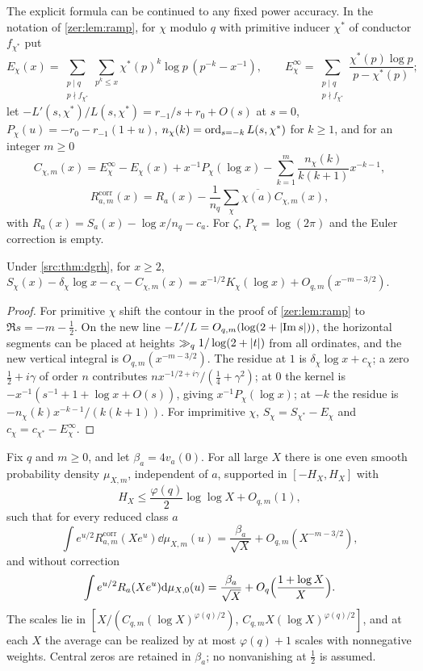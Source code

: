 The explicit formula can be continued to any fixed power accuracy. In the notation of \cref{zer:lem:ramp}, for
$\chi$ modulo $q$ with primitive inducer $\chi^*$ of conductor $f_{\chi^*}$ put
\[
 E_\chi(x)=\sum_{\substack{p\mid q\\p\nmid f_{\chi^*}}}\sum_{p^k\le x}\chi^*(p)^k\log p\,(p^{-k}-x^{-1}),\qquad
 E_\chi^\infty=\sum_{\substack{p\mid q\\p\nmid f_{\chi^*}}}\frac{\chi^*(p)\log p}{p-\chi^*(p)} ;
\]
let $-L'(s,\chi^*)/L(s,\chi^*)=r_{-1}/s+r_0+O(s)$ at $s=0$, $P_\chi(u)=-r_0-r_{-1}(1+u)$, $n_\chi(k)=\operatorname{ord}_{s=-k}L(s,\chi^*)$
for $k\ge1$, and for an integer $m\ge0$
\[
 C_{\chi,m}(x)=E_\chi^\infty-E_\chi(x)+x^{-1}P_\chi(\log x)-\sum_{k=1}^m\frac{n_\chi(k)}{k(k+1)}x^{-k-1},
\]
\[
 R^{\mathrm{corr}}_{a,m}(x)=R_a(x)-\frac1{n_q}\sum_\chi\overline{\chi(a)}C_{\chi,m}(x),
\]
with $R_a(x)=S_a(x)-\log x/n_q-c_a$. For $\zeta$, $P_\chi=\log(2\pi)$ and the Euler correction is empty.

\begin{lemma}\label{fil:lem:rampcorr}
Under \cref{src:thm:dgrh}, for $x\ge2$,
$S_\chi(x)-\delta_\chi\log x-c_\chi-C_{\chi,m}(x)=x^{-1/2}K_\chi(\log x)+O_{q,m}(x^{-m-3/2})$.
\end{lemma}

\begin{proof}
For primitive $\chi$ shift the contour in the proof of \cref{zer:lem:ramp} to $\Re s=-m-\tfrac12$. On the new line
$-L'/L=O_{q,m}(\log(2+\lvert\operatorname{Im} s\rvert))$, the horizontal segments can be placed at heights $\gg_q1/\log(2+\lvert t\rvert)$ from all
ordinates, and the new vertical integral is $O_{q,m}(x^{-m-3/2})$. The residue at $1$ is $\delta_\chi\log x+c_\chi$; a
zero $\tfrac12+i\gamma$ of order $n$ contributes $nx^{-1/2+i\gamma}/(\tfrac14+\gamma^2)$; at $0$ the kernel is
$-x^{-1}(s^{-1}+1+\log x+O(s))$, giving $x^{-1}P_\chi(\log x)$; at $-k$ the residue is
$-n_\chi(k)x^{-k-1}/(k(k+1))$. For imprimitive $\chi$, $S_\chi=S_{\chi^*}-E_\chi$ and $c_\chi=c_{\chi^*}-E_\chi^\infty$.
\end{proof}

\begin{theorem}\label{rec:thm:polylogavg}
Fix $q$ and $m\ge0$, and let $\beta_a=4v_a(0)$. For all large $X$ there is one even smooth probability density
$\mu_{X,m}$, independent of $a$, supported in $[-H_X,H_X]$ with
\[
 H_X\le\frac{\varphi(q)}2\log\log X+O_{q,m}(1),
\]
such that for every reduced class $a$
\[
 \int e^{u/2}R^{\mathrm{corr}}_{a,m}(Xe^u)\dd\mu_{X,m}(u)=\frac{\beta_a}{\sqrt X}+O_{q,m}(X^{-m-3/2}),
\]
and without correction
\[
 \int e^{u/2}R_a(Xe^u)\mathrm{d}\mu_{X,0}(u)=\frac{\beta_a}{\sqrt X}+O_q\Bigl(\frac{1+\log X}X\Bigr).
\]
The scales lie in $[X/(C_{q,m}(\log X)^{\varphi(q)/2}),\,C_{q,m}X(\log X)^{\varphi(q)/2}]$, and at each $X$ the average
can be realized by at most $\varphi(q)+1$ scales with nonnegative weights. Central zeros are retained in
$\beta_a$; no nonvanishing at $\tfrac12$ is assumed.
\end{theorem}

